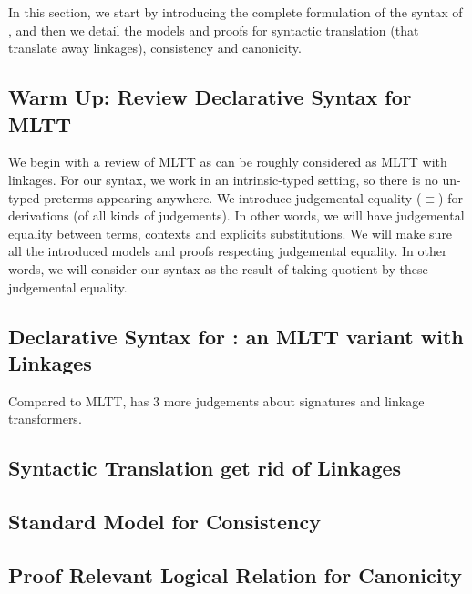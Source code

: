 In this section, we start by introducing the complete formulation of the syntax of \TT, 
and then we detail the models and proofs for syntactic translation (that translate away linkages), 
consistency and canonicity. 

\subsection{Warm Up: Review Declarative Syntax for MLTT}
We begin with a review of MLTT as \TT can be roughly considered as MLTT with linkages.
For our syntax, we work in an intrinsic-typed setting, so there is no un-typed preterms appearing anywhere. We introduce judgemental equality ($\equiv$)
for derivations (of all kinds of judgements). In other words, we will have judgemental equality between terms, 
contexts and explicits substitutions. 
We will make sure all the introduced models and proofs respecting judgemental equality. In other words, we will consider our syntax as the result of taking quotient by these judgemental equality.



\subsection{Declarative Syntax for \TT : an MLTT variant with Linkages}
Compared to MLTT, \TT has 3 more judgements about signatures and linkage transformers.








\subsection{Syntactic Translation get rid of Linkages}



\subsection{Standard Model for Consistency}




\subsection{Proof Relevant Logical Relation for Canonicity}

